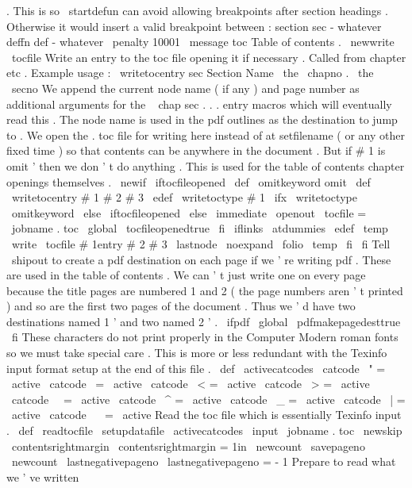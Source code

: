 {{.
This
is
so
\
startdefun
can
avoid
allowing
breakpoints
after
%
section
headings
.
Otherwise
it
would
insert
a
valid
breakpoint
between
:
%
%
section
sec
-
whatever
%
deffn
def
-
whatever
\
penalty
10001
}
\
message
{
toc
}
%
Table
of
contents
.
\
newwrite
\
tocfile
%
Write
an
entry
to
the
toc
file
opening
it
if
necessary
.
%
Called
from
chapter
etc
.
%
%
Example
usage
:
\
writetocentry
{
sec
}
{
Section
Name
}
{
\
the
\
chapno
.
\
the
\
secno
}
%
We
append
the
current
node
name
(
if
any
)
and
page
number
as
additional
%
arguments
for
the
\
{
chap
sec
.
.
.
}
entry
macros
which
will
eventually
%
read
this
.
The
node
name
is
used
in
the
pdf
outlines
as
the
%
destination
to
jump
to
.
%
%
We
open
the
.
toc
file
for
writing
here
instead
of
at
setfilename
(
or
%
any
other
fixed
time
)
so
that
contents
can
be
anywhere
in
the
document
.
%
But
if
#
1
is
omit
'
then
we
don
'
t
do
anything
.
This
is
used
for
the
%
table
of
contents
chapter
openings
themselves
.
%
\
newif
\
iftocfileopened
\
def
\
omitkeyword
{
omit
}
%
%
\
def
\
writetocentry
#
1
#
2
#
3
{
%
\
edef
\
writetoctype
{
#
1
}
%
\
ifx
\
writetoctype
\
omitkeyword
\
else
\
iftocfileopened
\
else
\
immediate
\
openout
\
tocfile
=
\
jobname
.
toc
\
global
\
tocfileopenedtrue
\
fi
%
\
iflinks
{
\
atdummies
\
edef
\
temp
{
%
\
write
\
tocfile
{
#
1entry
{
#
2
}
{
#
3
}
{
\
lastnode
}
{
\
noexpand
\
folio
}
}
}
%
\
temp
}
\
fi
\
fi
%
%
Tell
\
shipout
to
create
a
pdf
destination
on
each
page
if
we
'
re
%
writing
pdf
.
These
are
used
in
the
table
of
contents
.
We
can
'
t
%
just
write
one
on
every
page
because
the
title
pages
are
numbered
%
1
and
2
(
the
page
numbers
aren
'
t
printed
)
and
so
are
the
first
%
two
pages
of
the
document
.
Thus
we
'
d
have
two
destinations
named
%
1
'
and
two
named
2
'
.
\
ifpdf
\
global
\
pdfmakepagedesttrue
\
fi
}
%
These
characters
do
not
print
properly
in
the
Computer
Modern
roman
%
fonts
so
we
must
take
special
care
.
This
is
more
or
less
redundant
%
with
the
Texinfo
input
format
setup
at
the
end
of
this
file
.
%
\
def
\
activecatcodes
{
%
\
catcode
\
"
=
\
active
\
catcode
\
=
\
active
\
catcode
\
<
=
\
active
\
catcode
\
>
=
\
active
\
catcode
\
\
=
\
active
\
catcode
\
^
=
\
active
\
catcode
\
_
=
\
active
\
catcode
\
|
=
\
active
\
catcode
\
~
=
\
active
}
%
Read
the
toc
file
which
is
essentially
Texinfo
input
.
\
def
\
readtocfile
{
%
\
setupdatafile
\
activecatcodes
\
input
\
jobname
.
toc
}
\
newskip
\
contentsrightmargin
\
contentsrightmargin
=
1in
\
newcount
\
savepageno
\
newcount
\
lastnegativepageno
\
lastnegativepageno
=
-
1
%
Prepare
to
read
what
we
'
ve
written
}
